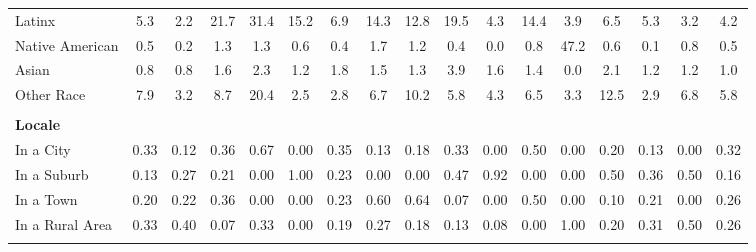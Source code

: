 \begin{tabular*}{\linewidth}{@{\extracolsep{\fill} } lcccccccccccccccc}
\hspace{0.2cm}Latinx&5.3&2.2&21.7&31.4&15.2&6.9&14.3&12.8&19.5&4.3&14.4&3.9&6.5&5.3&3.2&4.2\\%
\hspace{0.2cm}Native American&0.5&0.2&1.3&1.3&0.6&0.4&1.7&1.2&0.4&0.0&0.8&47.2&0.6&0.1&0.8&0.5\\%
\hspace{0.2cm}Asian&0.8&0.8&1.6&2.3&1.2&1.8&1.5&1.3&3.9&1.6&1.4&0.0&2.1&1.2&1.2&1.0\\%
\hspace{0.2cm}Other Race&7.9&3.2&8.7&20.4&2.5&2.8&6.7&10.2&5.8&4.3&6.5&3.3&12.5&2.9&6.8&5.8\\%
&&&&&&&&&&&&&&&&\\%
\multicolumn{17}{l}{\bfseries Locale}\\%
\hspace{0.2cm}In a City&0.33&0.12&0.36&0.67&0.00&0.35&0.13&0.18&0.33&0.00&0.50&0.00&0.20&0.13&0.00&0.32\\%
\hspace{0.2cm}In a Suburb&0.13&0.27&0.21&0.00&1.00&0.23&0.00&0.00&0.47&0.92&0.00&0.00&0.50&0.36&0.50&0.16\\%
\hspace{0.2cm}In a Town&0.20&0.22&0.36&0.00&0.00&0.23&0.60&0.64&0.07&0.00&0.50&0.00&0.10&0.21&0.00&0.26\\%
\hspace{0.2cm}In a Rural Area&0.33&0.40&0.07&0.33&0.00&0.19&0.27&0.18&0.13&0.08&0.00&1.00&0.20&0.31&0.50&0.26\\%
&&&&&&&&&&&&&&&&\\%
\hline%
\end{tabular*}